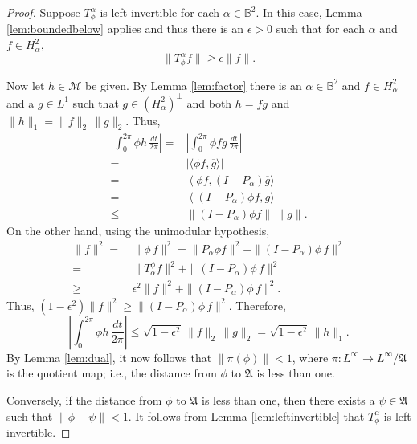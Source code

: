 \documentclass[12pt]{amsart}
\theoremstyle{definition}
\theoremstyle{remark}
\numberwithin{equation}{section}
\begin{document}
\begin{proof}
Suppose $T^\alpha_\phi$ is left invertible for each $\alpha\in{\mathbb{B}^2}$. In this case, Lemma \ref{lem:boundedbelow} applies and thus
there is an $\epsilon>0$ such that for each $\alpha$ and $f\in H^2_\alpha$,
\[
 \|T^\alpha_\phi f\|\ge \epsilon \|f\|.
\]

Now let $h\in\mathscr{M}$ be given. By Lemma \ref{lem:factor} there is an $\alpha\in {\mathbb{B}^2}$ and $f\in H^2_\alpha$ and a $g\in L^1$ such that $\overline{g}\in (H^2_\alpha)^\perp$
and both $h=fg$ and $\|h\|_1 = \|f\|_2\,\|g\|_2$.  Thus,
\[
\begin{split}
\left | {\int_{0}^{2\pi}} \phi h \,{\frac{dt}{2\pi}} \right | 
  = & \left | {\int_{0}^{2\pi}} \phi fg \, {\frac{dt}{2\pi}} \right |\\
 = &\left | \langle \phi f,\overline{g}\rangle \right | \\
 = & \left \langle \phi f,(I-P_\alpha)\overline{g}\rangle \right | \\
 = & \left \langle (I-P_\alpha)\phi f,\overline{g} \rangle \right |\\
\le & \|(I-P_\alpha)\phi f\| \, \|g\|. 
\end{split}
\]
On the other hand, using the unimodular hypothesis,
\[
\begin{split}
 \|f\|^2= & \,  \|\phi \, f\|^2= \|P_\alpha \phi f\|^2 +\|(I-P_\alpha)\phi\, f\|^2 \\
 = & \, \|T^\phi_\alpha f\|^2 + \|(I-P_\alpha)\phi \, f\|^2 \\
 \ge & \, \epsilon^2 \|f\|^2  + \|(I-P_\alpha)\phi \, f\|^2.
\end{split}
\]
Thus, $(1-\epsilon^2) \|f\|^2 \ge \|(I-P_\alpha)\phi\, f\|^2.$
Therefore,
\[
 \left | {\int_{0}^{2\pi}} \phi h \,{\frac{dt}{2\pi}} \right | \le \sqrt{1-\epsilon^2} \, \|f\|_2\,\|g\|_2 = 
  \sqrt{1-\epsilon^2}\, \|h\|_1.
\]
By Lemma \ref{lem:dual}, it now follows that $\|\pi(\phi)\|<1$, where $\pi:L^\infty \to L^\infty/{\mathfrak{A}}$ is the quotient map; i.e.,
the distance from $\phi$ to ${\mathfrak{A}}$ is less than one.

{Conversely, if the distance from $\phi$ to ${\mathfrak{A}}$ is less than one, then there exists a $\psi \in {\mathfrak{A}}$ such that $\|\phi - \psi\| < 1$. It follows from Lemma  \ref{lem:leftinvertible} that $T^\alpha_\phi$ is left invertible.}
\end{proof}
\end{document}
